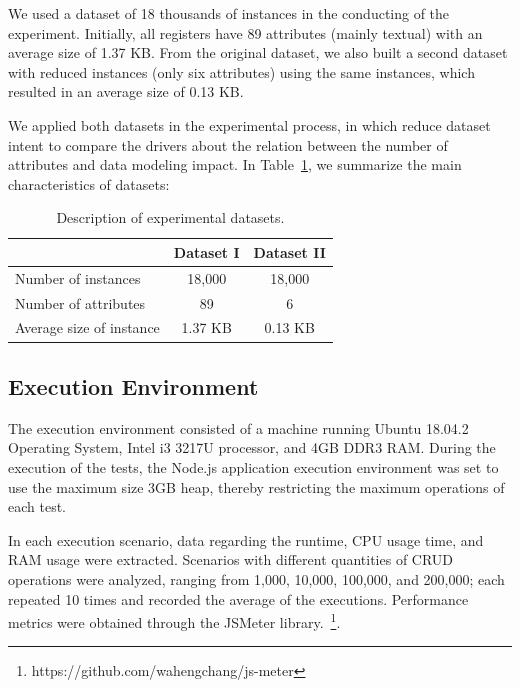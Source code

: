 \documentclass{svproc}
\begin{document}

We used a dataset of 18 thousands of instances in the conducting of the experiment. Initially, all registers have 89 attributes (mainly textual) with an average size of 1.37 KB.
From the original dataset, we also built a second dataset with reduced instances (only six attributes) using the same instances, which resulted in an average size of 0.13 KB.

We applied both datasets in the experimental process, in which reduce dataset intent to compare the drivers about the relation between the number of attributes and data modeling impact.
In Table~\ref{tab:conjunto-dados}, we summarize the main characteristics of datasets:

\begin{table}[ht]
\centering
\caption{Description of experimental datasets.}
\label{tab:conjunto-dados}
\begin{tabular}{c|c|c|}
\cline{2-3}
                         & \textbf{Dataset I} & \textbf{Dataset II} \\ \hline
\multicolumn{1}{|l|}{Number of instances} & 18,000 		 			& 18,000            \\ \hline
\multicolumn{1}{|l|}{Number of attributes}  & 89        		 			& 6                  \\ \hline
\multicolumn{1}{|l|}{Average size of instance}   & 1.37 KB        				& 0.13 KB                    \\ \hline
\end{tabular}
\end{table}

\subsection{Execution Environment}

The execution environment consisted of a machine running Ubuntu 18.04.2 Operating System, Intel i3 3217U processor, and 4GB DDR3 RAM.
During the execution of the tests, the Node.js application execution environment was set to use the maximum size 3GB heap, thereby restricting the maximum operations of each test.

In each execution scenario, data regarding the runtime, CPU usage time, and RAM usage were extracted.
Scenarios with different quantities of CRUD operations were analyzed, ranging from 1,000, 10,000, 100,000, and 200,000; each repeated 10 times and recorded the average of the executions. Performance metrics were obtained through the JSMeter library.~\footnote{https://github.com/wahengchang/js-meter}. 
\end{document}
